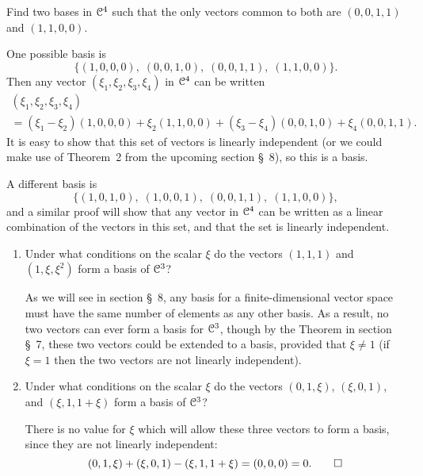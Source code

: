  Find two bases in $\mathcal{C}^4$ such that the only vectors common
to both are $(0,0,1,1)$ and $(1,1,0,0)$.
\begin{solution}
  One possible basis is
  \begin{equation*}
    \{ (1,0,0,0), \; (0,0,1,0), \; (0,0,1,1), \; (1,1,0,0) \}.
  \end{equation*}
  Then any vector $(\xi_1,\xi_2,\xi_3,\xi_4)$ in $\mathcal{C}^4$ can be written
  \begin{multline*}
    (\xi_1,\xi_2,\xi_3,\xi_4) \\
    = (\xi_1 - \xi_2)(1,0,0,0) + \xi_2(1,1,0,0)
    + (\xi_3 - \xi_4)(0,0,1,0) + \xi_4(0,0,1,1).
  \end{multline*}
  It is easy to show that this set of vectors is linearly independent
  (or we could make use of Theorem~2 from the upcoming section \S\ 8),
  so this is a basis.

  A different basis is
  \begin{equation*}
    \{ (1,0,1,0), \; (1,0,0,1), \; (0,0,1,1), \; (1,1,0,0) \},
  \end{equation*}
  and a similar proof will show that any vector in $\mathcal{C}^4$ can be
  written as a linear combination of the vectors in this set, and that
  the set is linearly independent.
\end{solution}

\begin{enumerate}
\item Under what conditions on the scalar $\xi$ do the vectors
  $(1,1,1)$ and $(1,\xi,\xi^2)$ form a basis of $\mathcal{C}^3$?
  \begin{solution}
    As we will see in section \S\ 8, any basis for a
    finite-dimensional vector space must have the same number of
    elements as any other basis. As a result, no two vectors can ever
    form a basis for $\mathcal{C}^3$, though by the Theorem in section \S\ 7,
    these two vectors could be extended to a basis, provided that
    $\xi\neq1$ (if $\xi = 1$ then the two vectors are not linearly
    independent).
  \end{solution}
\item Under what conditions on the scalar $\xi$ do the vectors
  $(0,1,\xi)$, $(\xi,0,1)$, and $(\xi,1,1+\xi)$ form a basis of
  $\mathcal{C}^3$?
  \begin{solution}
    There is no value for $\xi$ which will allow these three vectors
    to form a basis, since they are not linearly independent:
    \begin{equation*}
      (0,1,\xi) + (\xi,0,1) - (\xi,1,1+\xi) = (0,0,0) = 0. \qedhere
    \end{equation*}
  \end{solution}
\end{enumerate}
